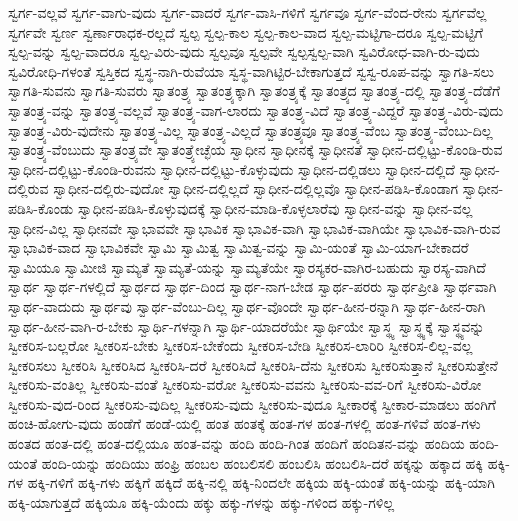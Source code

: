 {ಸ್ವರ್ಗ-ವಲ್ಲವೆ
ಸ್ವರ್ಗ-ವಾಗು-ವುದು
ಸ್ವರ್ಗ-ವಾದರೆ
ಸ್ವರ್ಗ-ವಾಸಿ-ಗಳಿಗೆ
ಸ್ವರ್ಗವೂ
ಸ್ವರ್ಗ-ವೆಂದ-ರೇನು
ಸ್ವರ್ಗವೆಲ್ಲ
ಸ್ವರ್ಗವೇ
ಸ್ವರ್ಣ
ಸ್ವರ್ಣಾರಾಧಕ-ರಲ್ಲದೆ
ಸ್ವಲ್ಪ
ಸ್ವಲ್ಪ-ಕಾಲ
ಸ್ವಲ್ಪ-ಕಾಲ-ವಾದ
ಸ್ವಲ್ಪ-ಮಟ್ಟಿಗಾ-ದರೂ
ಸ್ವಲ್ಪ-ಮಟ್ಟಿಗೆ
ಸ್ವಲ್ಪ-ವನ್ನು
ಸ್ವಲ್ಪ-ವಾದರೂ
ಸ್ವಲ್ಪ-ವಿರು-ವುದು
ಸ್ವಲ್ಪವೂ
ಸ್ವಲ್ಪವೇ
ಸ್ವಲ್ಪಸ್ವಲ್ಪ-ವಾಗಿ
ಸ್ವವಿರೋಧ-ವಾಗಿ-ರು-ವುದು
ಸ್ವವಿರೋಧಿ-ಗಳಂತೆ
ಸ್ವಸ್ತಿಕದ
ಸ್ವಸ್ಥ-ನಾಗಿ-ರುವೆಯಾ
ಸ್ವಸ್ಥ-ವಾಗಿಟ್ಟಿರ-ಬೇಕಾಗುತ್ತದೆ
ಸ್ವಸ್ವ-ರೂಪ-ವನ್ನು
ಸ್ವಾಗತಿ-ಸಲು
ಸ್ವಾಗತಿ-ಸುವನು
ಸ್ವಾಗತಿ-ಸುವರು
ಸ್ವಾತಂತ್ರ್ಯ
ಸ್ವಾತಂತ್ರ್ಯಕ್ಕಾಗಿ
ಸ್ವಾತಂತ್ರ್ಯಕ್ಕೆ
ಸ್ವಾತಂತ್ರ್ಯದ
ಸ್ವಾತಂತ್ರ್ಯ-ದಲ್ಲಿ
ಸ್ವಾತಂತ್ರ್ಯ-ದೆಡೆಗೆ
ಸ್ವಾತಂತ್ರ್ಯ-ವನ್ನು
ಸ್ವಾತಂತ್ರ್ಯ-ವಲ್ಲವೆ
ಸ್ವಾತಂತ್ರ್ಯ-ವಾಗ-ಲಾರದು
ಸ್ವಾತಂತ್ರ್ಯ-ವಿದೆ
ಸ್ವಾತಂತ್ರ್ಯ-ವಿದ್ದರೆ
ಸ್ವಾತಂತ್ರ್ಯ-ವಿರು-ವುದು
ಸ್ವಾತಂತ್ರ್ಯ-ವಿರು-ವುದೇನು
ಸ್ವಾತಂತ್ರ್ಯ-ವಿಲ್ಲ
ಸ್ವಾತಂತ್ರ್ಯ-ವಿಲ್ಲದೆ
ಸ್ವಾತಂತ್ರ್ಯವೂ
ಸ್ವಾತಂತ್ರ್ಯ-ವೆಂಬ
ಸ್ವಾತಂತ್ರ್ಯ-ವೆಂಬು-ದಿಲ್ಲ
ಸ್ವಾತಂತ್ರ್ಯ-ವೆಂಬುದು
ಸ್ವಾತಂತ್ರ್ಯವೇ
ಸ್ವಾತಂತ್ರ್ಯೇಚ್ಛೆಯ
ಸ್ವಾಧೀನ
ಸ್ವಾಧೀನಕ್ಕೆ
ಸ್ವಾಧೀನತೆ
ಸ್ವಾಧೀನ-ದಲ್ಲಿಟ್ಟು-ಕೊಂಡಿ-ರುವ
ಸ್ವಾಧೀನ-ದಲ್ಲಿಟ್ಟು-ಕೊಂಡಿ-ರುವನು
ಸ್ವಾಧೀನ-ದಲ್ಲಿಟ್ಟು-ಕೊಳ್ಳುವುದು
ಸ್ವಾಧೀನ-ದಲ್ಲಿಡಲು
ಸ್ವಾಧೀನ-ದಲ್ಲಿದೆ
ಸ್ವಾಧೀನ-ದಲ್ಲಿರುವ
ಸ್ವಾಧೀನ-ದಲ್ಲಿರು-ವುದೋ
ಸ್ವಾಧೀನ-ದಲ್ಲಿಲ್ಲದೆ
ಸ್ವಾಧೀನ-ದಲ್ಲಿಲ್ಲವೊ
ಸ್ವಾಧೀನ-ಪಡಿಸಿ-ಕೊಂಡಾಗ
ಸ್ವಾಧೀನ-ಪಡಿಸಿ-ಕೊಂಡು
ಸ್ವಾಧೀನ-ಪಡಿಸಿ-ಕೊಳ್ಳುವುದಕ್ಕೆ
ಸ್ವಾಧೀನ-ಮಾಡಿ-ಕೊಳ್ಳಲಾರೆವು
ಸ್ವಾಧೀನ-ವನ್ನು
ಸ್ವಾಧೀನ-ವಲ್ಲ
ಸ್ವಾಧೀನ-ವಿಲ್ಲ
ಸ್ವಾಧೀನವೇ
ಸ್ವಾಭಾವವೇ
ಸ್ವಾಭಾವಿಕ
ಸ್ವಾಭಾವಿಕ-ವಾಗಿ
ಸ್ವಾಭಾವಿಕ-ವಾಗಿಯೇ
ಸ್ವಾಭಾವಿಕ-ವಾಗಿ-ರುವ
ಸ್ವಾಭಾವಿಕ-ವಾದ
ಸ್ವಾಭಾವಿಕವೇ
ಸ್ವಾಮಿ
ಸ್ವಾಮಿತ್ವ
ಸ್ವಾಮಿತ್ವ-ವನ್ನು
ಸ್ವಾಮಿ-ಯಂತೆ
ಸ್ವಾಮಿ-ಯಾಗ-ಬೇಕಾದರೆ
ಸ್ವಾಮಿಯೂ
ಸ್ವಾಮೀಜಿ
ಸ್ವಾಮ್ಯತೆ
ಸ್ವಾಮ್ಯತೆ-ಯನ್ನು
ಸ್ವಾಮ್ಯತೆಯೇ
ಸ್ವಾರಸ್ಯಕರ-ವಾಗಿರ-ಬಹುದು
ಸ್ವಾರಸ್ಯ-ವಾಗಿದೆ
ಸ್ವಾರ್ಥ
ಸ್ವಾರ್ಥ-ಗಳಲ್ಲಿದೆ
ಸ್ವಾರ್ಥದ
ಸ್ವಾರ್ಥ-ದಿಂದ
ಸ್ವಾರ್ಥ-ನಾಗ-ಬೇಡ
ಸ್ವಾರ್ಥ-ಪರರು
ಸ್ವಾರ್ಥಪ್ರೀತಿ
ಸ್ವಾರ್ಥವಾಗಿ
ಸ್ವಾರ್ಥ-ವಾದುದು
ಸ್ವಾರ್ಥವು
ಸ್ವಾರ್ಥ-ವೆಂಬು-ದಿಲ್ಲ
ಸ್ವಾರ್ಥ-ವೊಂದೇ
ಸ್ವಾರ್ಥ-ಹೀನ-ರನ್ನಾಗಿ
ಸ್ವಾರ್ಥ-ಹೀನ-ರಾಗಿ
ಸ್ವಾರ್ಥ-ಹೀನ-ವಾಗಿ-ರ-ಬೇಕು
ಸ್ವಾರ್ಥಿ-ಗಳನ್ನಾಗಿ
ಸ್ವಾರ್ಥಿ-ಯಾದರೆಯೇ
ಸ್ವಾರ್ಥಿಯೇ
ಸ್ವಾಸ್ಥ್ಯ
ಸ್ವಾಸ್ಥ್ಯಕ್ಕೆ
ಸ್ವಾಸ್ಥ್ಯವನ್ನು
ಸ್ವೀಕರಿಸ-ಬಲ್ಲರೋ
ಸ್ವೀಕರಿಸ-ಬೇಕು
ಸ್ವೀಕರಿಸ-ಬೇಕೆಂದು
ಸ್ವೀಕರಿಸ-ಬೇಡಿ
ಸ್ವೀಕರಿಸ-ಲಾರಿರಿ
ಸ್ವೀಕರಿಸ-ಲಿಲ್ಲ-ವಲ್ಲ
ಸ್ವೀಕರಿಸಲು
ಸ್ವೀಕರಿಸಿ
ಸ್ವೀಕರಿಸಿದ
ಸ್ವೀಕರಿಸಿ-ದರೆ
ಸ್ವೀಕರಿಸಿದೆ
ಸ್ವೀಕರಿಸಿ-ದೆನು
ಸ್ವೀಕರಿಸು
ಸ್ವೀಕರಿಸುತ್ತಾನೆ
ಸ್ವೀಕರಿಸುತ್ತೇನೆ
ಸ್ವೀಕರಿಸು-ವಂತಿಲ್ಲ
ಸ್ವೀಕರಿಸು-ವಂತೆ
ಸ್ವೀಕರಿಸು-ವರೋ
ಸ್ವೀಕರಿಸು-ವವನು
ಸ್ವೀಕರಿಸು-ವವ-ರಿಗೆ
ಸ್ವೀಕರಿಸು-ವಿರೋ
ಸ್ವೀಕರಿಸು-ವುದ-ರಿಂದ
ಸ್ವೀಕರಿಸು-ವುದಿಲ್ಲ
ಸ್ವೀಕರಿಸು-ವುದು
ಸ್ವೀಕರಿಸು-ವುದೂ
ಸ್ವೀಕಾರಕ್ಕೆ
ಸ್ವೀಕಾರ-ಮಾಡಲು
ಹಂಗಿಗೆ
ಹಂಚಿ-ಹೋಗು-ವುದು
ಹಂಡೆಗೆ
ಹಂಡೆ-ಯಲ್ಲಿ
ಹಂತ
ಹಂತಕ್ಕೆ
ಹಂತ-ಗಳ
ಹಂತ-ಗಳಲ್ಲಿ
ಹಂತ-ಗಳಿವೆ
ಹಂತ-ಗಳು
ಹಂತದ
ಹಂತ-ದಲ್ಲಿ
ಹಂತ-ದಲ್ಲಿಯೂ
ಹಂತ-ವನ್ನು
ಹಂದಿ
ಹಂದಿ-ಗಿಂತ
ಹಂದಿಗೆ
ಹಂದಿತನ-ವನ್ನು
ಹಂದಿಯ
ಹಂದಿ-ಯಂತೆ
ಹಂದಿ-ಯನ್ನು
ಹಂದಿಯು
ಹಂಫ್ರಿ
ಹಂಬಲ
ಹಂಬಲಿಸಲಿ
ಹಂಬಲಿಸಿ
ಹಂಬಲಿಸಿ-ದರೆ
ಹಕ್ಕನ್ನು
ಹಕ್ಕಾದ
ಹಕ್ಕಿ
ಹಕ್ಕಿ-ಗಳ
ಹಕ್ಕಿ-ಗಳಿಗೆ
ಹಕ್ಕಿ-ಗಳು
ಹಕ್ಕಿಗೆ
ಹಕ್ಕಿದೆ
ಹಕ್ಕಿ-ನಲ್ಲಿ
ಹಕ್ಕಿ-ನಿಂದಲೇ
ಹಕ್ಕಿಯ
ಹಕ್ಕಿ-ಯಂತೆ
ಹಕ್ಕಿ-ಯನ್ನು
ಹಕ್ಕಿ-ಯಾಗಿ
ಹಕ್ಕಿ-ಯಾಗುತ್ತದೆ
ಹಕ್ಕಿಯೂ
ಹಕ್ಕಿ-ಯೆಂದು
ಹಕ್ಕು
ಹಕ್ಕು-ಗಳನ್ನು
ಹಕ್ಕು-ಗಳಿಂದ
ಹಕ್ಕು-ಗಳಿಲ್ಲ
}
